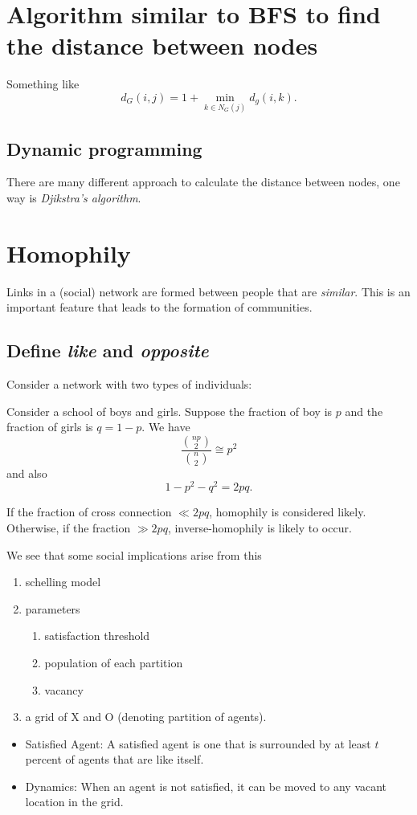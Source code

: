 \section{Algorithm similar to BFS to find the distance between nodes}
Something like
\[
	d_G(i, j) = 1 + \min_{k\in N_G(j)} d_g(i, k).
\]

\subsection{Dynamic programming}
There are many different approach to calculate the distance between nodes, one way is \emph{Djikstra's algorithm}.

\section{Homophily}
Links in a (social) network are formed between people that are \emph{similar}. This is an important feature that leads to
the formation of communities.

\subsection{Define \emph{like} and \emph{opposite}}
Consider a network with two types of individuals:
\begin{eg}
	Consider a school of boys and girls. Suppose the fraction of boy is $p$ and the fraction of girls is $q = 1 - p$. We have
	\[
		\frac{\binom{np}{2}}{\binom{n}{2}} \cong p^2
	\]
	and also
	\[
		1 - p^2 - q^2 = 2pq.
	\]

	If the fraction of cross connection $\ll 2pq$, homophily is considered likely. Otherwise, if the fraction $\gg 2pq$, inverse-homophily is likely to occur.
\end{eg}

We see that some social implications arise from this
\begin{enumerate}
	\item schelling model
	\item parameters
	      \begin{enumerate}
		      \item satisfaction threshold
		      \item population of each partition
		      \item vacancy
	      \end{enumerate}
	\item a grid of X and O (denoting partition of agents).
\end{enumerate}

\begin{itemize}
	\item Satisfied Agent: A satisfied agent is one that is surrounded by at least \(t\) percent of agents that are like itself.
	\item Dynamics: When an agent is not satisfied, it can be moved to any vacant location in the grid.
\end{itemize}

